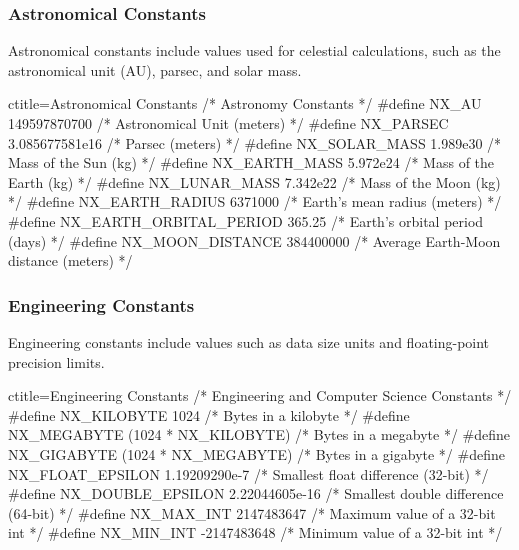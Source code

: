 \newpage
\subsubsection{Astronomical Constants}
\label{Astronomical Constants}
\begin{NexMainBox}
	\begin{NexMainBox}
		Astronomical constants include values used for celestial calculations, such as the astronomical unit (AU), parsec, and solar mass.
	\end{NexMainBox}
\end{NexMainBox}

\begin{NexCodeBox}{c}{title={Astronomical Constants}}
/* Astronomy Constants */
#define NX_AU 149597870700		/* Astronomical Unit (meters) */
#define NX_PARSEC 3.085677581e16	/* Parsec (meters) */
#define NX_SOLAR_MASS 1.989e30		/* Mass of the Sun (kg) */
#define NX_EARTH_MASS 5.972e24		/* Mass of the Earth (kg) */
#define NX_LUNAR_MASS 7.342e22		/* Mass of the Moon (kg) */
#define NX_EARTH_RADIUS 6371000		/* Earth's mean radius (meters) */
#define NX_EARTH_ORBITAL_PERIOD 365.25	/* Earth's orbital period (days) */
#define NX_MOON_DISTANCE 384400000	/* Average Earth-Moon distance (meters) */
\end{NexCodeBox}

\newpage
\subsubsection{Engineering Constants}
\label{Engineering Constants}
\begin{NexMainBox}
	\begin{NexMainBox}
		Engineering constants include values such as data size units and floating-point precision limits.
	\end{NexMainBox}
\end{NexMainBox}

\begin{NexCodeBox}{c}{title={Engineering Constants}}
/* Engineering and Computer Science Constants */
#define NX_KILOBYTE 1024			/* Bytes in a kilobyte */
#define NX_MEGABYTE (1024 * NX_KILOBYTE)	/* Bytes in a megabyte */
#define NX_GIGABYTE (1024 * NX_MEGABYTE)	/* Bytes in a gigabyte */
#define NX_FLOAT_EPSILON 1.19209290e-7		/* Smallest float difference (32-bit) */
#define NX_DOUBLE_EPSILON 2.22044605e-16	/* Smallest double difference (64-bit) */
#define NX_MAX_INT 2147483647			/* Maximum value of a 32-bit int */
#define NX_MIN_INT -2147483648			/* Minimum value of a 32-bit int */
\end{NexCodeBox}

